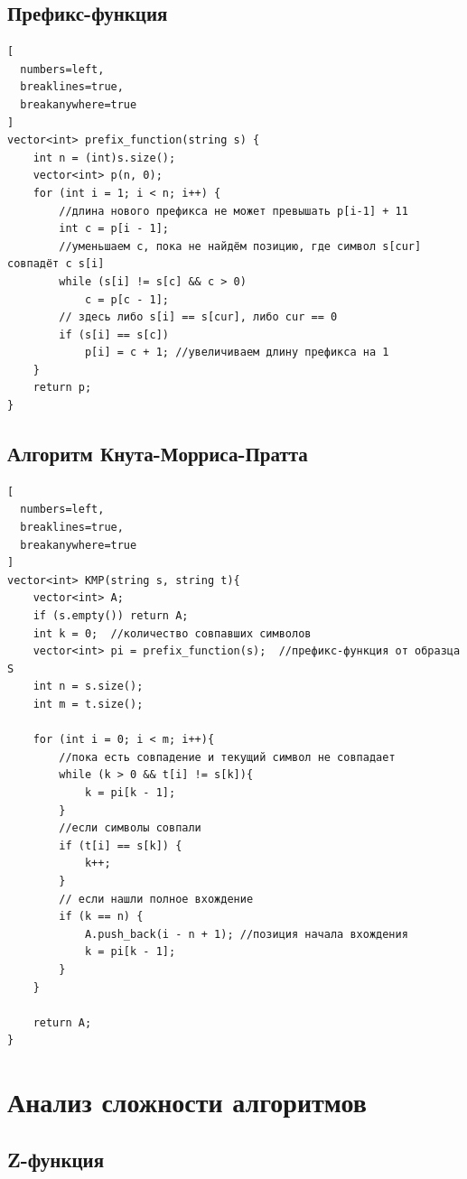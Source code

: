 \documentclass[otchet]{SCWorks}
\begin{document}
\subsection{Префикс-функция}

\begin{Verbatim}[
  numbers=left,
  breaklines=true,
  breakanywhere=true
]
vector<int> prefix_function(string s) {
    int n = (int)s.size();
    vector<int> p(n, 0);
    for (int i = 1; i < n; i++) {
        //длина нового префикса не может превышать p[i-1] + 11
        int c = p[i - 1];
        //уменьшаем c, пока не найдём позицию, где символ s[cur] совпадёт с s[i]
        while (s[i] != s[c] && c > 0)
            c = p[c - 1];
        // здесь либо s[i] == s[cur], либо cur == 0
        if (s[i] == s[c])
            p[i] = c + 1; //увеличиваем длину префикса на 1
    }
    return p;
}
\end{Verbatim}

\subsection{Алгоритм Кнута-Морриса-Пратта}

\begin{Verbatim}[
  numbers=left,
  breaklines=true,
  breakanywhere=true
]
vector<int> KMP(string s, string t){
    vector<int> A;
    if (s.empty()) return A;
    int k = 0;  //количество совпавших символов
    vector<int> pi = prefix_function(s);  //префикс-функция от образца S
    int n = s.size();
    int m = t.size();

    for (int i = 0; i < m; i++){
        //пока есть совпадение и текущий символ не совпадает
        while (k > 0 && t[i] != s[k]){
            k = pi[k - 1];
        }
        //если символы совпали
        if (t[i] == s[k]) {
            k++;
        }
        // если нашли полное вхождение
        if (k == n) {
            A.push_back(i - n + 1); //позиция начала вхождения
            k = pi[k - 1];
        }
    }

    return A;
}
\end{Verbatim}

\newpage

\section{Анализ сложности алгоритмов}

\subsection{Z-функция}
\end{document}
